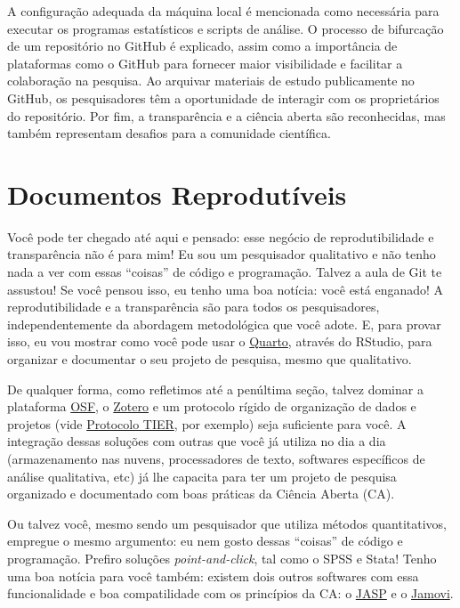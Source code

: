 \documentclass[
  a4paper,
]{article}
\begin{document}
\begin{tcolorbox}
A configuração adequada da máquina local é mencionada como necessária
para executar os programas estatísticos e scripts de análise. O processo
de bifurcação de um repositório no GitHub é explicado, assim como a
importância de plataformas como o GitHub para fornecer maior
visibilidade e facilitar a colaboração na pesquisa. Ao arquivar
materiais de estudo publicamente no GitHub, os pesquisadores têm a
oportunidade de interagir com os proprietários do repositório. Por fim,
a transparência e a ciência aberta são reconhecidas, mas também
representam desafios para a comunidade científica.

\end{tcolorbox}


\section{Documentos Reprodutíveis}\label{sec-quarto}

Você pode ter chegado até aqui e pensado: esse negócio de
reprodutibilidade e transparência não é para mim! Eu sou um pesquisador
qualitativo e não tenho nada a ver com essas ``coisas'' de código e
programação. Talvez a aula de Git te assustou! Se você pensou isso, eu
tenho uma boa notícia: você está enganado! A reprodutibilidade e a
transparência são para todos os pesquisadores, independentemente da
abordagem metodológica que você adote. E, para provar isso, eu vou
mostrar como você pode usar o \href{https://quarto.org/}{Quarto},
através do RStudio, para organizar e documentar o seu projeto de
pesquisa, mesmo que qualitativo.

De qualquer forma, como refletimos até a penúltima seção, talvez dominar
a plataforma \href{https://osf.io/}{OSF}, o
\href{https://www.zotero.org/}{Zotero} e um protocolo rígido de
organização de dados e projetos (vide
\href{https://www.projecttier.org/tier-protocol/protocol-4-0/}{Protocolo
TIER}, por exemplo) seja suficiente para você. A integração dessas
soluções com outras que você já utiliza no dia a dia (armazenamento nas
nuvens, processadores de texto, softwares específicos de análise
qualitativa, etc) já lhe capacita para ter um projeto de pesquisa
organizado e documentado com boas práticas da Ciência Aberta (CA).

Ou talvez você, mesmo sendo um pesquisador que utiliza métodos
quantitativos, empregue o mesmo argumento: eu nem gosto dessas
``coisas'' de código e programação. Prefiro soluções
\emph{point-and-click}, tal como o SPSS e Stata! Tenho uma boa notícia
para você também: existem dois outros softwares com essa funcionalidade
e boa compatilidade com os princípios da CA: o
\href{https://jasp-stats.org/}{JASP} e o
\href{https://www.jamovi.org/}{Jamovi}.
\end{document}
